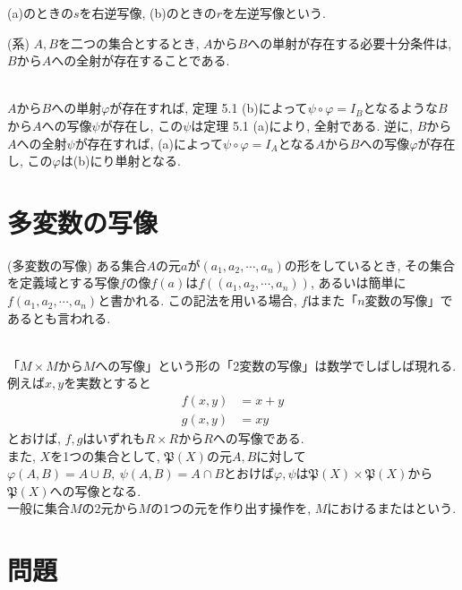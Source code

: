 \documentclass[a4j]{jsarticle}
\begin{document}
 (a)のときの$s$を右逆写像, (b)のときの$r$を左逆写像という. \\

\begin{itembox}[l]{ (系)}
	$A,B$を二つの集合とするとき, $A$から$B$への単射が存在する必要十分条件は, $B$から$A$への全射が存在することである.
\end{itembox}\\

 $A$から$B$への単射$\varphi$が存在すれば, 定理 5.1 (b)によって$\psi \circ \varphi = I_B$となるような$B$から$A$への写像$\psi$が存在し, この$\psi$は定理 5.1 (a)により, 全射である. 逆に, $B$から$A$への全射$\psi$が存在すれば, (a)によって$\psi \circ \varphi = I_A$となる$A$から$B$への写像$\varphi$が存在し, この$\varphi$は(b)にり単射となる.

\section{多変数の写像}

\begin{itembox}[l]{ (多変数の写像)}
	ある集合$A$の元$a$が$(a_1,a_2,\cdots,a_n)$の形をしているとき, その集合を定義域とする写像$f$の像$f(a)$は$f((a_1,a_2,\cdots,a_n))$, あるいは簡単に$f(a_1,a_2,\cdots,a_n)$と書かれる. この記法を用いる場合, $f$はまた「$n$変数の写像」であるとも言われる.
\end{itembox}\\

 「$M \times M$から$M$への写像」という形の「2変数の写像」は数学でしばしば現れる. \\
例えば$x,y$を実数とすると
\begin{align}
	f(x,y) & = x + y \\
	g(x,y) & = xy
\end{align}
とおけば, $f,g$はいずれも$R \times R$から$R$への写像である. \\

また, $X$を1つの集合として, $\mathfrak{P}(X)$の元$A,B$に対して$\varphi(A,B) = A \cup B,\:\psi(A,B) = A \cap B$とおけば$\varphi,\psi$は$\mathfrak{P}(X) \times \mathfrak{P}(X)$から$\mathfrak{P}(X)$への写像となる. \\

一般に集合$M$の2元から$M$の1つの元を作り出す操作を, $M$におけるまたはという.

\section{問題}
\end{document}
